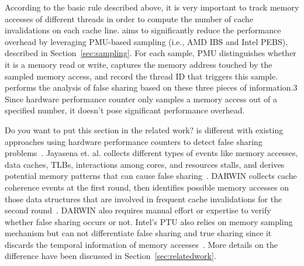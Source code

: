 According to the basic rule described above, it is very important to track memory accesses of different threads in order to compute the number of cache invalidations on each cache line. 
\cheetah{} aims to significantly reduce the performance overhead by leveraging PMU-based sampling (i.e., AMD IBS and Intel PEBS), described in Section~\ref{sec:sampling}.
For each sample, PMU distinguishes whether it is a memory read or write, captures the memory address touched by the sampled memory access, and record the thread ID that triggers this sample. \Cheetah{} performs the analysis of false sharing based on these three pieces of information.3
Since hardware performance counter only samples a memory access out of a specified number, it doesn't pose significant performance overhead. 

{\color{blue}Do you want to put this section in the related work?}
\cheetah{} is different with existing approaches using hardware performance counters to detect false sharing problems~\cite{mldetect, openmp, detect:ptu}. Jayasena et. al. collects different types of events like memory accesses, data caches, TLBs, interactions among cores, and resources stalls, and derives potential memory patterns that can cause false sharing~\cite{mldetect}. DARWIN collects cache coherence events at the first round, then identifies possible memory accesses on those data structures that are involved in frequent cache invalidations for the second round~\cite{openmp}. DARWIN also requires manual effort or expertise to verify whether false sharing occurs or not.  Intel's PTU also relies on memory sampling mechanism but can not differentiate false sharing and true sharing since it discards the temporal information of memory accesses~\cite{detect:ptu}. More details on the difference have been discussed in Section~\ref{sec:relatedwork}.

